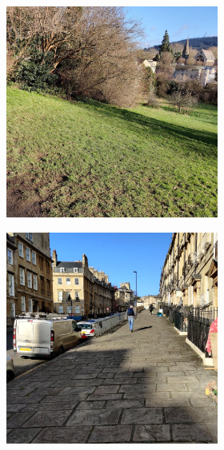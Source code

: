 \begin{figure}[p]
    \begin{subfigure}[b]{\textwidth}
        \centering
        \begin{subfigure}[b]{0.32\textwidth}
            \centering
            \includegraphics[width=\textwidth]{content/3-Methods/enviroments/ramp_1_modified.jpg}
        \end{subfigure}
        \hfill
        \begin{subfigure}[b]{0.32\textwidth}
            \centering
            \includegraphics[width=\textwidth]{content/3-Methods/enviroments/ramp_2_modified.jpg}

\end{subfigure}
\end{subfigure}
\end{figure}
